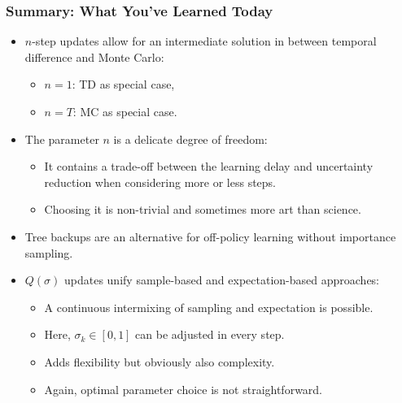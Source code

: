 \begin{frame}
\frametitle{Summary: What You've Learned Today}
\begin{itemize}
	\item $n$-step updates allow for an intermediate solution in between temporal difference and Monte Carlo:
	\begin{itemize}
		\item $n=1$: TD as special case,
		\item $n=T$: MC as special case.
	\end{itemize}\pause
	\item The parameter $n$ is a delicate degree of freedom:
	\begin{itemize}
		\item It contains a trade-off between the learning delay and uncertainty reduction when considering more or less steps.
		\item Choosing it is non-trivial and sometimes more art than science.
	\end{itemize}\pause
	\item Tree backups are an alternative for off-policy learning without importance sampling.\pause
	\item $Q(\sigma)$ updates unify sample-based and expectation-based approaches:
	\begin{itemize}
		\item A continuous intermixing of sampling and expectation is possible.
		\item Here, $\sigma_k \in [0,1]$ can be adjusted in every step.
		\item Adds flexibility but obviously also complexity.
		\item Again, optimal parameter choice is not straightforward.
	\end{itemize}
\end{itemize}
\end{frame}

